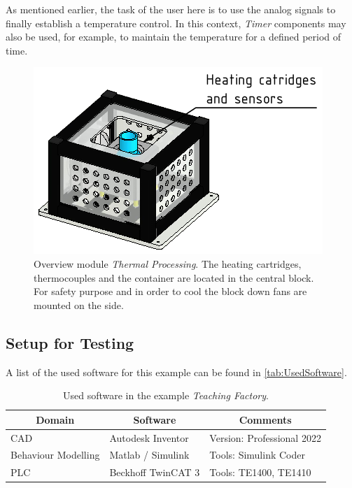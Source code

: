     As mentioned earlier, the task of the user here is to use the analog signals to finally establish a temperature control. In this context, \textit{Timer} components may also be used, for example, to maintain the temperature for a defined period of time.
	\begin{figure}[htp]
		\centering
		\includegraphics{figures/CadThermal.pdf}
		\caption[Overview module \textit{Thermal Processing}.]{Overview module \textit{Thermal Processing}. The heating cartridges, thermocouples and the container are located in the central block. For safety purpose and in order to cool the block down fans are mounted on the side. }
		\label{fig:ModuleThermalIntroduction}
	\end{figure}
	
	
    \subsection{Setup for Testing}  \label{sec:ExampleSetupTesting}
        A list of the used software for this example can be found in \autoref{tab:UsedSoftware}. \\
        \begin{table}[htp]
    	    \footnotesize
    	    \centering
    		\caption{Used software in the example \textit{Teaching Factory}.}
    		\begin{tabular}{lll}
    			\toprule
    			\multicolumn{1}{c}{Domain} & \multicolumn{1}{c}{Software} & \multicolumn{1}{c}{Comments}\\
    			\midrule
    		    CAD & Autodesk Inventor & Version: Professional 2022 \\
    		    Behaviour Modelling & Matlab / Simulink & Tools: Simulink Coder \\
                PLC & Beckhoff TwinCAT 3 & Tools: TE1400, TE1410\\
    			\bottomrule	
    		\end{tabular}	
    		\label{tab:UsedSoftware}
    	\end{table}
    	
